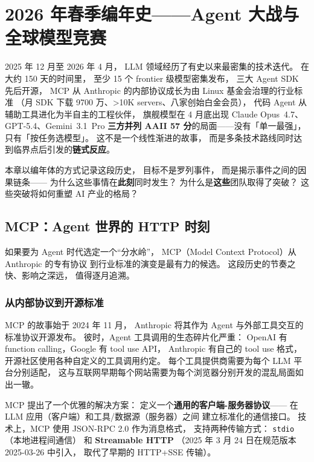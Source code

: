 \chapter{2026 年春季编年史——Agent 大战与全球模型竞赛}
\label{ch:agent-wars}

2025 年 12 月至 2026 年 4 月，
LLM 领域经历了有史以来最密集的技术迭代。
在大约 150 天的时间里，
至少 15 个 frontier 级模型密集发布，
三大 Agent SDK 先后开源，
MCP 从 Anthropic 的内部协议成长为由 Linux 基金会治理的行业标准
（月 SDK 下载 9700 万、>10K servers、八家创始白金会员），
代码 Agent 从辅助工具进化为半自主的工程伙伴，
旗舰模型在 4 月底出现 Claude Opus~4.7、GPT-5.4、Gemini~3.1~Pro
\textbf{三方并列 AAII 57 分}的局面——没有「单一最强」，只有「按任务选模型」。
这不是一个线性渐进的故事，
而是多条技术路线同时达到临界点后引发的\textbf{链式反应}。

本章以编年体的方式记录这段历史，
目标不是罗列事件，
而是揭示事件之间的因果链条——
为什么这些事情在\textbf{此刻}同时发生？
为什么是\textbf{这些}团队取得了突破？
这些突破将如何重塑 AI 产业的格局？

\section{MCP：Agent 世界的 HTTP 时刻}
\label{sec:mcp-http-moment}

如果要为 Agent 时代选定一个“分水岭”，
MCP（Model Context Protocol）从 Anthropic 的专有协议
到行业标准的演变是最有力的候选。
这段历史的节奏之快、影响之深远，
值得逐月追溯。

\subsection{从内部协议到开源标准}

MCP 的故事始于 2024 年 11 月，
Anthropic 将其作为 Agent 与外部工具交互的标准协议开源发布。
彼时，Agent 工具调用的生态碎片化严重：
OpenAI 有 function calling，Google 有 tool use API，
Anthropic 有自己的 tool use 格式，
开源社区使用各种自定义的工具调用约定。
每个工具提供商需要为每个 LLM 平台分别适配，
这与互联网早期每个网站需要为每个浏览器分别开发的混乱局面如出一辙。

MCP 提出了一个优雅的解决方案：
定义一个\textbf{通用的客户端-服务器协议}——
在 LLM 应用（客户端）和工具/数据源（服务器）之间
建立标准化的通信接口。
技术上，MCP 使用 JSON-RPC 2.0 作为消息格式，
支持两种传输方式：
\texttt{stdio}（本地进程间通信）
和 \textbf{Streamable HTTP}
（2025 年 3 月 24 日在规范版本 2025-03-26 中引入，
取代了早期的 HTTP+SSE 传输）。

